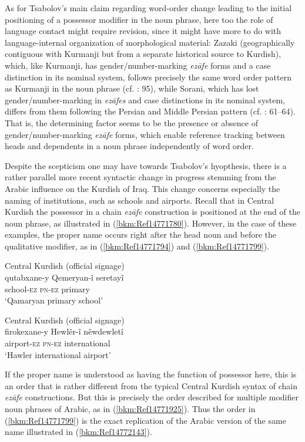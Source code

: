\documentclass[output=paper]{langsci/langscibook}
\begin{document}
As for Tsabolov’s main claim regarding word-order change leading to the initial positioning of a possessor modifier in the noun phrase, here too the role of language contact might require revision, since it might have more to do with language-internal organization of morphological material: Zazaki (geographically contiguous with Kurmanji but from a separate historical source to Kurdish), which, like Kurmanji, has gender/number-marking \textit{ezāfe} forms and a case distinction in its nominal system, follows precisely the same word order pattern as Kurmanji in the noun phrase (cf. \citealt{Todd2002}: 95), while Sorani, which has lost gender/number-marking in \textit{ezāfes} and case distinctions in its nominal system, differs from them following the Persian and Middle Persian pattern (cf. \citealt{Öpengin2016}: 61–64). That is, the determining factor seems to be the presence or absence of gender/number-marking \textit{ezāfe} forms, which enable reference tracking between heads and dependents in a noun phrase independently of word order.   

Despite the scepticism one may have towards Tsabolov’s hyopthesis, there is a rather parallel more recent syntactic change in progress stemming from the Arabic influence on the Kurdish of Iraq. This change concerns especially the naming of institutions, such as schools and airports. Recall that in Central Kurdish the possessor in a chain \textit{ezāfe} construction is positioned at the end of the noun phrase, as illustrated in (\ref{bkm:Ref14771780}). However, in the case of these examples, the proper name occurs right after the head noun and before the qualitative modifier, as in (\ref{bkm:Ref14771794}) and (\ref{bkm:Ref14771799}). 

\ea\label{bkm:Ref14771794}Central Kurdish (official signage)\\
\gll qutabxane-y Qemeryan-î seretayî\\
     school-\textsc{ez} \textsc{pn-ez} primary\\
\glt ‘Qamaryan primary school’
\z

\ea\label{bkm:Ref14771799}Central Kurdish (official signage)\\
\gll firokexane-y Hewlêr-î nêwdewletî\\
     airport-\textsc{ez} \textsc{pn-ez} international\\
\glt ‘Hawler international airport’
\z

If the proper name is understood as having the function of possessor here, this is an order that is rather different from the typical Central Kurdish syntax of chain \textit{ezāfe} constructions. But this is precisely the order described for multiple modifier noun phrases of Arabic, as in (\ref{bkm:Ref14771925}). Thus the order in (\ref{bkm:Ref14771799}) is the exact replication of the Arabic version of the same name illustrated in (\ref{bkm:Ref14772143}).
\end{document}
